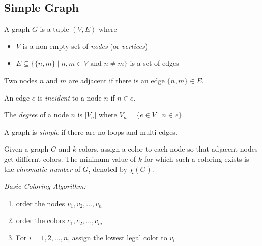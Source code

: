 \documentclass[11pt]{article}
\begin{document}
\subsection{Simple Graph}

\begin{definition}
A graph $G$ is a tuple $(V, E)$ where
\begin{itemize}
\item $V$ is a non-empty set of \emph{nodes} (or \emph{vertices})
\item $E \subseteq \{\{n,m\} \mid n,m \in V \text{ and } n \neq m\}$ is a set of edges
\end{itemize}
\end{definition}

\begin{definition}
Two nodes $n$ and $m$ are adjacent if there is an edge $\{n,m\} \in E$.
\end{definition}

\begin{definition}
An edge $e$ is \emph{incident} to a node $n$ if $n \in e$.
\end{definition}

\begin{definition}
The \emph{degree} of a node $n$ is $|V_n|$ where $V_n = \{e \in V \mid n \in e \}$.
\end{definition}

\begin{definition}
A graph is \emph{simple} if there are no loops and multi-edges.
\end{definition}

\begin{definition}
Given a graph $G$ and $k$ colors, assign a color to each node so that adjacent nodes get difffernt
colors. The minimum value of $k$ for which such a coloring exists is the \emph{chromatic number} of
$G$, denoted by $\chi(G)$.
\end{definition}

\begin{definition}
\emph{Basic Coloring Algorithm:}
\begin{enumerate}
\item order the nodes $v_1,v_2,\dots,v_n$
\item order the colors $c_1,c_2,\dots,c_m$
\item For $i=1,2,\dots,n$, assign the lowest legal color to $v_i$
\end{enumerate}
\end{definition}
\end{document}
